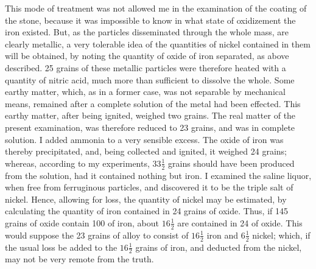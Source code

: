 \documentclass[a4paper, 12pt, oneside]{article}
\begin{document}
This mode of treatment was not allowed me in the examination of the coating of the stone, because it was impossible to know in what state of oxidizement the iron existed. But, as the particles disseminated through the whole mass, are clearly metallic, a very tolerable idea of the quantities of nickel contained in them will be obtained, by noting the quantity of oxide of iron separated, as above described. 25 grains of these metallic particles were therefore heated with a quantity of nitric acid, much more than sufficient to dissolve the whole. Some earthy matter, which, as in a former case, was not separable by mechanical means, remained after a complete solution of the metal had been effected. This earthy matter, after being ignited, weighed two grains. The real matter of the present examination, was therefore reduced to 23 grains, and was in complete solution. I added ammonia to a very sensible excess. The oxide of iron was thereby precipitated, and, being collected and ignited, it weighed 24 grains; whereas, according to my experiments, $33\frac{1}{2}$ grains should have been produced from the solution, had it contained nothing but iron. I examined the saline liquor, when free from ferruginous particles, and discovered it to be the triple salt of nickel. Hence, allowing for loss, the quantity of nickel may be estimated, by calculating the quantity of iron contained in 24 grains of oxide. Thus, if 145 grains of oxide contain 100 of iron, about $16\frac{1}{2}$ are contained in 24 of oxide. This would suppose the 23 grains of alloy to consist of $16\frac{1}{2}$ iron and $6\frac{1}{2}$ nickel; which, if the usual loss be added to the $16\frac{1}{2}$ grains of iron, and deducted from the nickel, may not be very remote from the truth.
\end{document}
